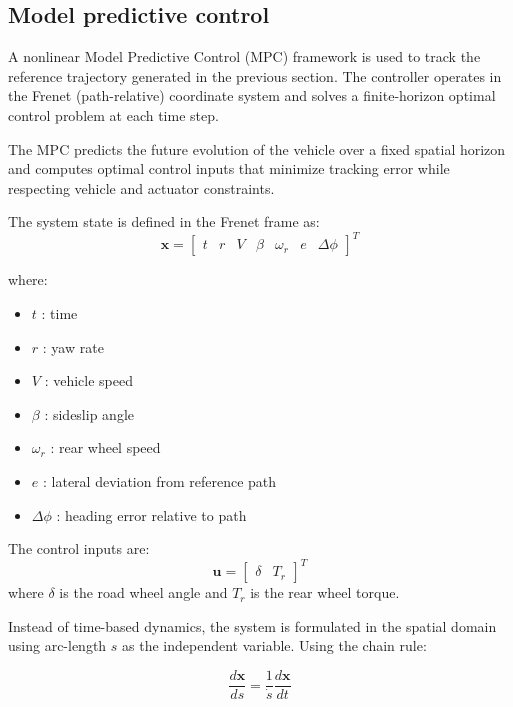 \documentclass{article}
\begin{document}
\subsection{Model predictive control}

A nonlinear Model Predictive Control (MPC) framework is used to track the reference trajectory generated in the previous section. The controller operates in the Frenet (path-relative) coordinate system and solves a finite-horizon optimal control problem at each time step.

The MPC predicts the future evolution of the vehicle over a fixed spatial horizon and computes optimal control inputs that minimize tracking error while respecting vehicle and actuator constraints.

The system state is defined in the Frenet frame as:
\begin{equation}
\mathbf{x} =
\begin{bmatrix}
t & r & V & \beta & \omega_r & e & \Delta \phi
\end{bmatrix}^T
\end{equation}

where:
\begin{itemize}
    \item $t$ : time
    \item $r$ : yaw rate
    \item $V$ : vehicle speed
    \item $\beta$ : sideslip angle
    \item $\omega_r$ : rear wheel speed
    \item $e$ : lateral deviation from reference path
    \item $\Delta \phi$ : heading error relative to path
\end{itemize}

The control inputs are:
\begin{equation}
\mathbf{u} =
\begin{bmatrix}
\delta & T_r
\end{bmatrix}^T
\end{equation}
where $\delta$ is the road wheel angle and $T_r$ is the rear wheel torque.

Instead of time-based dynamics, the system is formulated in the spatial domain using arc-length $s$ as the independent variable. Using the chain rule:

\begin{equation}
\frac{d\mathbf{x}}{ds} = \frac{1}{\dot{s}} \frac{d\mathbf{x}}{dt}
\end{equation}
\end{document}
